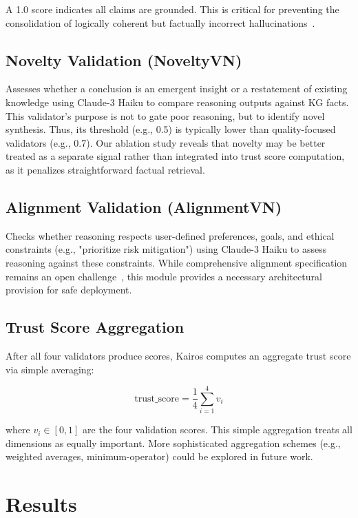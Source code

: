 \documentclass{article}
\begin{document}
A 1.0 score indicates all claims are grounded. This is critical for preventing the consolidation of logically coherent but factually incorrect hallucinations~\citep{edge2024graphrag}.

\subsection{Novelty Validation (NoveltyVN)}

Assesses whether a conclusion is an emergent insight or a restatement of existing knowledge using Claude-3 Haiku to compare reasoning outputs against KG facts. This validator's purpose is not to gate poor reasoning, but to identify novel synthesis. Thus, its threshold (e.g., 0.5) is typically lower than quality-focused validators (e.g., 0.7). Our ablation study reveals that novelty may be better treated as a separate signal rather than integrated into trust score computation, as it penalizes straightforward factual retrieval.

\subsection{Alignment Validation (AlignmentVN)}

Checks whether reasoning respects user-defined preferences, goals, and ethical constraints (e.g., "prioritize risk mitigation") using Claude-3 Haiku to assess reasoning against these constraints. While comprehensive alignment specification remains an open challenge~\citep{pan2024unifying}, this module provides a necessary architectural provision for safe deployment.

\subsection{Trust Score Aggregation}

After all four validators produce scores, Kairos computes an aggregate trust score via simple averaging:

\begin{equation}
\text{trust\_score} = \frac{1}{4} \sum_{i=1}^{4} v_i
\end{equation}

where $v_i \in [0,1]$ are the four validation scores. This simple aggregation treats all dimensions as equally important. More sophisticated aggregation schemes (e.g., weighted averages, minimum-operator) could be explored in future work.
\section{Results}
\end{document}
